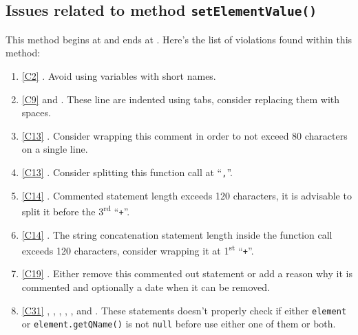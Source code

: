 \subsection{Issues related to method \texttt{setElementValue()}}
This method begins at  and ends at . Here's the list of violations found within this method:
\begin{enumerate}
	\item \ref{C2} . Avoid using variables with short names.
	\item \ref{C9}  and . These line are indented using tabs, consider replacing them with spaces.
	\item \ref{C13} . Consider wrapping this comment in order to not exceed 80 characters on a single line.
	\item \ref{C13} . Consider splitting this function call at ``\texttt{,}''.
	\item \ref{C14} . Commented statement length exceeds 120 characters, it is advisable to split it before the 3\textsuperscript{rd} ``\texttt{+}''.
	\item \ref{C14} . The string concatenation statement length inside the function call exceeds 120 characters, consider wrapping it at 1\textsuperscript{st} ``\texttt{+}''.
	\item \ref{C19} . Either remove this commented out statement or add a reason why it is commented and optionally a date when it can be removed.
	\item \ref{C31} , , , , ,  and . These statements doesn't properly check if either \texttt{element} or \texttt{element.getQName()} is not \texttt{null} before use either one of them or both.

\end{enumerate}
